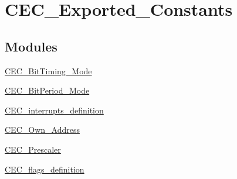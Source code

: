 \hypertarget{group__CEC__Exported__Constants}{
\section{CEC\_\-Exported\_\-Constants}
\label{group__CEC__Exported__Constants}
}
\subsection*{Modules}
\begin{DoxyCompactItemize}
\item 
\hyperlink{group__CEC__BitTiming__Mode}{CEC\_\-BitTiming\_\-Mode}
\item 
\hyperlink{group__CEC__BitPeriod__Mode}{CEC\_\-BitPeriod\_\-Mode}
\item 
\hyperlink{group__CEC__interrupts__definition}{CEC\_\-interrupts\_\-definition}
\item 
\hyperlink{group__CEC__Own__Address}{CEC\_\-Own\_\-Address}
\item 
\hyperlink{group__CEC__Prescaler}{CEC\_\-Prescaler}
\item 
\hyperlink{group__CEC__flags__definition}{CEC\_\-flags\_\-definition}
\end{DoxyCompactItemize}
